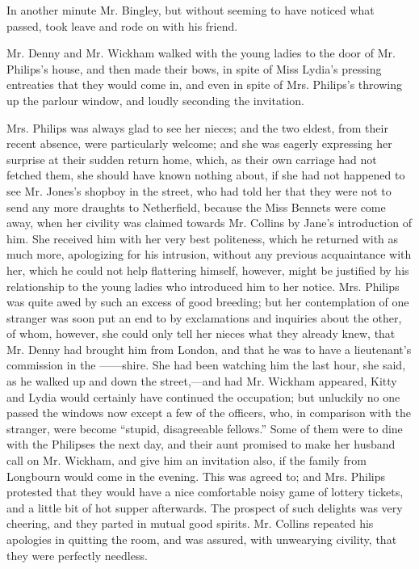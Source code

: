\documentclass[10pt]{book}
\begin{document}
   In another minute Mr. Bingley, but without seeming to have noticed what
passed, took leave and rode on with his friend.
  

   Mr. Denny and Mr. Wickham walked with the young ladies to the door of
Mr. Philips’s house, and then made their bows, in spite of Miss Lydia’s
pressing entreaties that they would come in, and even in spite of Mrs.
Philips’s throwing up the parlour window, and loudly seconding the
invitation.
  

   Mrs. Philips was always glad to see her nieces; and the two eldest, from
their recent absence, were particularly welcome; and she was eagerly
expressing her surprise at their sudden return home, which, as their own
carriage had not fetched them, she should have known nothing about, if
she had not happened to see Mr. Jones’s shopboy in the street, who had
told her that they were not to send any more draughts to Netherfield,
because the Miss Bennets were come away, when her civility was claimed
towards Mr. Collins by Jane’s introduction of him. She received him with
her very best politeness, which he returned with as much more,
apologizing for his intrusion, without any previous acquaintance with
her, which he could not help flattering himself, however, might be
justified by his relationship to the young ladies who introduced him to
her notice. Mrs. Philips was quite awed by such an excess of good
breeding; but her contemplation of one stranger was soon put an end to
by exclamations and inquiries about the other, of whom, however, she
could only tell her nieces what they already knew, that Mr. Denny had
brought him from London, and that he was to have a lieutenant’s
   commission in the ——shire. She had been watching him the last hour,
she said, as he walked up and down the street,—and had Mr. Wickham
appeared, Kitty and Lydia would certainly have continued the occupation;
but unluckily no one passed the windows now except a few of the
officers, who, in comparison with the stranger, were become “stupid,
disagreeable fellows.” Some of them were to dine with the Philipses the
next day, and their aunt promised to make her husband call on Mr.
Wickham, and give him an invitation also, if the family from Longbourn
would come in the evening. This was agreed to; and Mrs. Philips
protested that they would have a nice comfortable noisy game of lottery
tickets, and a little bit of hot supper afterwards. The prospect of such
delights was very cheering, and they parted in mutual good spirits. Mr.
Collins repeated his apologies in quitting the room, and was assured,
with unwearying civility, that they were perfectly needless.
  
\end{document}
